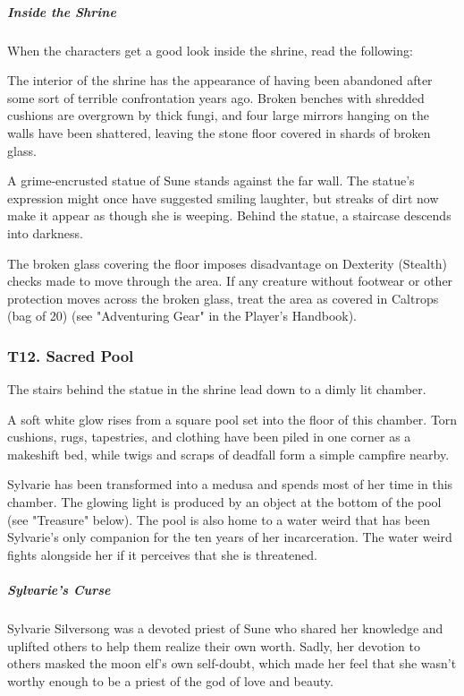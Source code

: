 \documentclass[10pt,a4paper,twoside,bg=print,twocolumn,openany,nodeprecatedcode]{dndbook}
\begin{document}
\subparagraph{Inside the Shrine}
When the characters get a good look inside the shrine, read the following:

\begin{DndReadAloud}{}
The interior of the shrine has the appearance of having been abandoned after some sort of terrible confrontation years ago. Broken benches with shredded cushions are overgrown by thick fungi, and four large mirrors hanging on the walls have been shattered, leaving the stone floor covered in shards of broken glass.

\end{DndReadAloud}

A grime-encrusted statue of Sune stands against the far wall. The statue's expression might once have suggested smiling laughter, but streaks of dirt now make it appear as though she is weeping. Behind the statue, a staircase descends into darkness.

The broken glass covering the floor imposes disadvantage on Dexterity (Stealth) checks made to move through the area. If any creature without footwear or other protection moves across the broken glass, treat the area as covered in Caltrops (bag of 20) (see "Adventuring Gear" in the Player's Handbook).

\subsubsection{T12. Sacred Pool}
The stairs behind the statue in the shrine lead down to a dimly lit chamber.

\begin{DndReadAloud}{}
A soft white glow rises from a square pool set into the floor of this chamber. Torn cushions, rugs, tapestries, and clothing have been piled in one corner as a makeshift bed, while twigs and scraps of deadfall form a simple campfire nearby.

\end{DndReadAloud}

Sylvarie has been transformed into a medusa and spends most of her time in this chamber. The glowing light is produced by an object at the bottom of the pool (see "Treasure" below). The pool is also home to a water weird that has been Sylvarie's only companion for the ten years of her incarceration. The water weird fights alongside her if it perceives that she is threatened.

\subparagraph{Sylvarie's Curse}
Sylvarie Silversong was a devoted priest of Sune who shared her knowledge and uplifted others to help them realize their own worth. Sadly, her devotion to others masked the moon elf's own self-doubt, which made her feel that she wasn't worthy enough to be a priest of the god of love and beauty.
\end{document}
